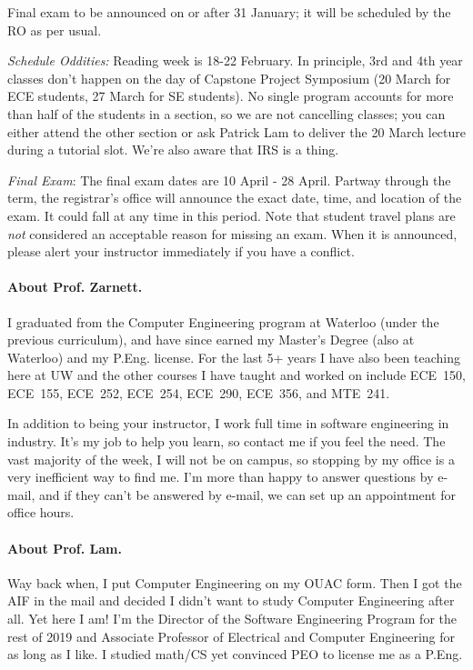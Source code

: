 \documentclass[letterpaper,10pt]{article}
\begin{document}
Final exam to be announced on or after 31 January; it will be scheduled by the RO as per usual.

\textit{Schedule Oddities:} Reading week is 18-22 February. In principle, 3rd and 4th year classes don't happen on the day of Capstone Project Symposium (20 March for ECE students, 27 March for SE students). No single program accounts for more than half of the students in a section, so we are not cancelling classes; you can either attend the other section or ask Patrick Lam to deliver the 20 March lecture during a tutorial slot. We're also aware that IRS is a thing.

\textit{Final Exam}: The final exam dates are 10 April - 28 April. Partway through the term, the registrar's office will announce the exact date, time, and location of the exam. It could fall at any time in this period. Note that student travel plans are \emph{not} considered an acceptable reason for missing an exam. When it is announced, please alert your instructor immediately if you have a conflict.

\paragraph{About Prof. Zarnett.}
I graduated from the Computer Engineering program at Waterloo (under the previous curriculum), and have since earned my Master's Degree (also at Waterloo) and my P.Eng. license. For the last 5+ years I have also been teaching here at UW and the other courses I have taught and worked on include ECE~150, ECE~155, ECE~252, ECE~254, ECE~290, ECE~356, and MTE~241.

In addition to being your instructor, I work full time in software engineering in industry. It's my job to help you learn, so contact me if you feel the need. The vast majority of the week, I will not be on campus, so stopping by my office is a very inefficient way to find me. I'm more than happy to answer questions by e-mail, and if they can't be answered by e-mail, we can set up an appointment for office hours.

\paragraph{About Prof. Lam.}
Way back when, I put Computer Engineering on my OUAC form. Then I got the AIF in the mail and decided I didn't want to study Computer Engineering after all. Yet here I am! I'm the Director of the Software Engineering Program for the rest of 2019 and Associate Professor of Electrical and Computer Engineering for as long as I like. I studied math/CS yet convinced PEO to license me as a P.Eng.
\end{document}

